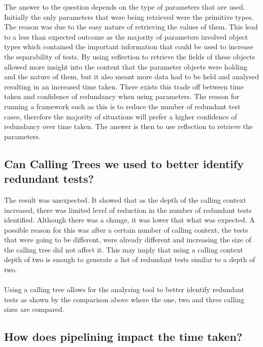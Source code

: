 The answer to the question depends on the type of parameters that are used. Initially the only parameters that were being retrieved were the primitive types. The reason was due to the easy nature of retrieving the values of them. This lead to a less than expected outcome as the majority of parameters involved object types which contained the important information that could be used to increase the separability of tests. By using reflection to retrieve the fields of these objects allowed more insight into the content that the parameter objects were holding and the nature of them, but it also meant more data had to be held and analysed resulting in an increased time taken. There exists this trade off between time taken and confidence of redundancy when using parameters. The reason for running a framework such as this is to reduce the number of redundant test cases, therefore the majority of situations will prefer a higher confidence of redundancy over time taken. The answer is then to use reflection to retrieve the parameters.


\subsection{Can Calling Trees we used to better identify redundant tests?}

The result was unexpected. It showed that as the depth of the calling context increased, there was limited level of reduction in the number of redundant tests identified. Although there was a change, it was lower that what was expected. A possible reason for this was after a certain number of calling context, the tests that were going to be different, were already different and increasing the size of the calling tree did not affect it. This may imply that using a calling context depth of two is enough to generate a list of redundant tests similar to a depth of two. 
\paragraph{}
Using a calling tree allows for the analysing tool to better identify redundant tests as shown by the comparison above where the one, two and three calling sizes are compared.

\subsection{How does pipelining impact the time taken?}


